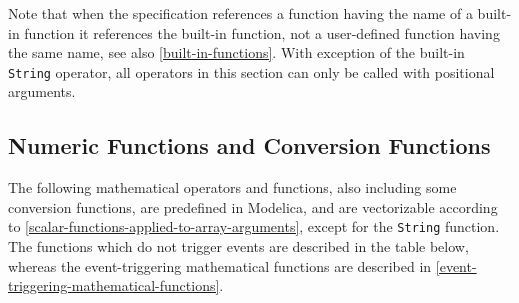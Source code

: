 Note that when the specification references a function having the name
of a built-in function it references the built-in function, not a
user-defined function having the same name, see also \cref{built-in-functions}. With
exception of the built-in \lstinline!String! operator, all operators in this section
can only be called with positional arguments.

\subsection{Numeric Functions and Conversion Functions}\label{numeric-functions-and-conversion-functions}

The following mathematical operators and functions, also including some
conversion functions, are predefined in Modelica, and are vectorizable
according to \cref{scalar-functions-applied-to-array-arguments}, except for the \lstinline!String! function. The
functions which do not trigger events are described in the table below,
whereas the event-triggering mathematical functions are described in
\cref{event-triggering-mathematical-functions}.

